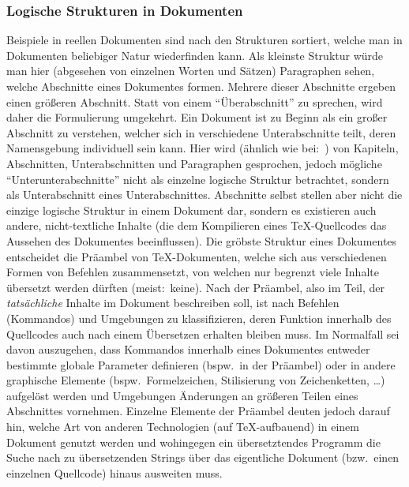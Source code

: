 \subsubsection*{Logische Strukturen in Dokumenten}\label{subsec:logicInDocuments}
Beispiele in reellen Dokumenten sind nach den Strukturen sortiert, welche man in Dokumenten beliebiger Natur wiederfinden kann. Als kleinste Struktur würde man hier (abgesehen von einzelnen Worten und Sätzen) Paragraphen sehen, welche Abschnitte eines Dokumentes formen. Mehrere dieser Abschnitte ergeben einen größeren Abschnitt. Statt von einem \enquote{Überabschnitt} zu sprechen, wird daher die Formulierung umgekehrt. Ein Dokument ist zu Beginn als ein großer Abschnitt zu verstehen, welcher sich in verschiedene Unterabschnitte teilt, deren Namensgebung individuell sein kann. Hier wird (ähnlich wie bei:~\cite{texbook}) von Kapiteln, Abschnitten, Unterabschnitten und Paragraphen gesprochen, jedoch mögliche \enquote{Unterunterabschnitte} nicht als einzelne logische Struktur betrachtet, sondern als Unterabschnitt eines Unterabschnittes. 
Abschnitte selbst stellen aber nicht die einzige logische Struktur in einem Dokument dar, sondern es existieren auch andere, nicht-textliche Inhalte (die dem Kompilieren eines \TeX{}-Quellcodes das Aussehen des Dokumentes beeinflussen). 
Die gröbste Struktur eines Dokumentes entscheidet die Präambel von \TeX{}-Dokumenten, welche sich aus verschiedenen Formen von Befehlen zusammensetzt, von welchen nur begrenzt viele Inhalte übersetzt werden dürften (meist:\ keine).
Nach der Präambel, also im Teil, der \textit{tatsächliche} Inhalte im Dokument beschreiben soll, ist nach Befehlen (Kommandos) und Umgebungen zu klassifizieren, deren Funktion innerhalb des Quellcodes auch nach einem Übersetzen erhalten bleiben muss. Im Normalfall sei davon auszugehen, dass Kommandos innerhalb eines Dokumentes entweder bestimmte globale Parameter definieren (bspw.\ in der Präambel) oder in andere graphische Elemente (bspw.\ Formelzeichen, Stilisierung von Zeichenketten, \ldots) aufgelöst werden und Umgebungen Änderungen an größeren Teilen eines Abschnittes vornehmen. Einzelne Elemente der Präambel deuten jedoch darauf hin, welche Art von anderen Technologien (auf \TeX{}-aufbauend) in einem Dokument genutzt werden und wohingegen ein übersetztendes Programm die Suche nach zu übersetzenden Strings über das eigentliche Dokument (bzw.\ einen einzelnen Quellcode) hinaus ausweiten muss.

